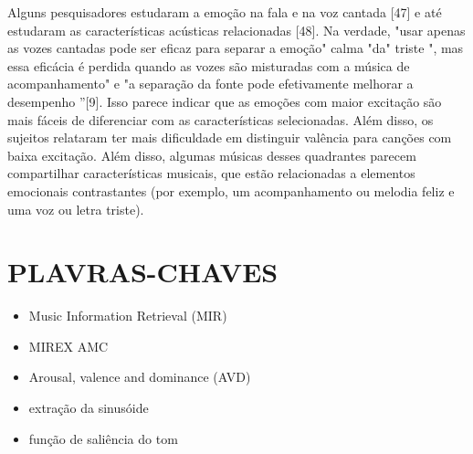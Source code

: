 \documentclass{article}
\begin{document}
Alguns pesquisadores estudaram a emoção na fala e na voz cantada [47] e até estudaram as características acústicas relacionadas [48]. Na verdade, "usar apenas as vozes cantadas pode ser eficaz para separar a emoção" calma "da" triste ", mas essa eficácia é perdida quando as vozes são misturadas com a música de acompanhamento" e "a separação da fonte pode efetivamente melhorar a desempenho ”[9].
Isso parece indicar que as emoções com maior excitação são mais fáceis de diferenciar com as características selecionadas.
Além disso, os sujeitos relataram ter mais dificuldade em distinguir valência para canções com baixa excitação. Além disso, algumas músicas desses quadrantes parecem compartilhar características musicais, que estão relacionadas a elementos emocionais contrastantes (por exemplo, um acompanhamento ou melodia feliz e uma voz ou letra triste).


\section{PLAVRAS-CHAVES}
\begin{itemize}
    \item Music Information Retrieval (MIR)
    \item MIREX AMC
    \item Arousal, valence and dominance (AVD)
    \item extração da sinusóide
    \item função de saliência do tom
\end{itemize}
\end{document}
